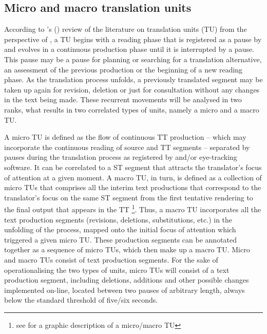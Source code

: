 \documentclass[output=paper]{LSP/langsci}
\begin{document}
\subsection{Micro and macro translation units}\label{sec:alves:2.1}

According to \citeauthor{AlvesVale2009}'s (\citeyear{AlvesVale2009}) review of the literature on translation units (TU) from the perspective of , a TU begins with a reading phase that is registered as a pause by   and evolves in a continuous production phase until it is interrupted by a pause. This pause may be a pause for planning or searching for a translation alternative, an assessment of the previous production or the beginning of a new reading phase. As the translation process unfolds, a previously translated segment may be taken up again for revision, deletion or just for consultation without any changes in the text being made. These recurrent movements will be analysed in two ranks, what results in two correlated types of units, namely a micro and a macro TU.

  
A micro TU is defined as the flow of continuous TT production -- which may incorporate the continuous reading of source and TT segments -- separated by pauses during the translation process as registered by  and/or eye-tracking software. It can be correlated to a ST segment that attracts the translator's focus of attention at a given moment. A macro TU, in turn, is defined as a collection of micro TUs that comprises all the interim text productions that correspond to the translator's focus on the same ST segment from the first tentative rendering to the final output that appears in the TT \footnote{see \cite[261]{AlvesVale2009} for a graphic description of a micro/macro TU}. Thus, a macro TU incorporates all the text production segments (revisions, deletions, substitutions, etc.) in the unfolding of the process, mapped onto the initial focus of attention which triggered a given micro TU. These production segments can be annotated together as a sequence of micro TUs, which then make up a macro TU. Micro and macro TUs consist of text production segments. For the sake of operationalising the two types of units, micro TUs will consist of a text production segment, including deletions, additions and other possible changes implemented on-line, located between two pauses of arbitrary length, always below the standard threshold of five/six seconds. 
\end{document}
